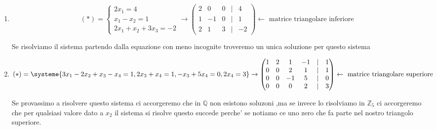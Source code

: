 \documentclass{article}
\begin{document}
\begin{enumerate}
	\item \begin{equation*}
		      (*)=
		      \begin{cases}
			      2x_1=4    \\
			      x_1-x_2=1 \\
			      2x_1+x_2+3x_3=-2
		      \end{cases} \to
		      \begin{pmatrix}
			      2 & 0  & 0 & | & 4  \\
			      1 & -1 & 0 & | & 1  \\
			      2 & 1  & 3 & | & -2
		      \end{pmatrix}\leftarrow \text{ matrice triangolare inferiore }
	      \end{equation*}
	      \begin{flushleft}
		      Se risolviamo il sistema partendo dalla equazione con meno incognite troveremo un unica soluzione per questo sistema
	      \end{flushleft}
	\item \begin{equation*}
		      (*)=\systeme{
			      3x_1-2x_2+x_3-x_4=1,
			      2x_3+x_4=1,
			      -x_3+5x_4=0,
			      2x_4=3
		      }\to\begin{pmatrix}
			      1 & 2 & 1  & -1 & | & 1 \\
			      0 & 0 & 2  & 1  & | & 1 \\
			      0 & 0 & -1 & 5  & | & 0 \\
			      0 & 0 & 0  & 2  & | & 3
		      \end{pmatrix}\leftarrow \text{ matrice triangolare superiore }
	      \end{equation*}
	      \begin{flushleft}
		      Se provassimo a risolvere questo sistema ci accorgeremo che in $\mathbb{Q}$ non esistono soluzoni
		      ,ma se invece lo risolviamo in $\mathbb{Z}_5$ ci accorgeremo che per qualsiasi valore dato a $x_2$ il sistema si risolve
		      questo succede perche' se notiamo ce uno zero che fa parte nel nostro triangolo superiore.
	      \end{flushleft}
\end{enumerate}
\end{document}
